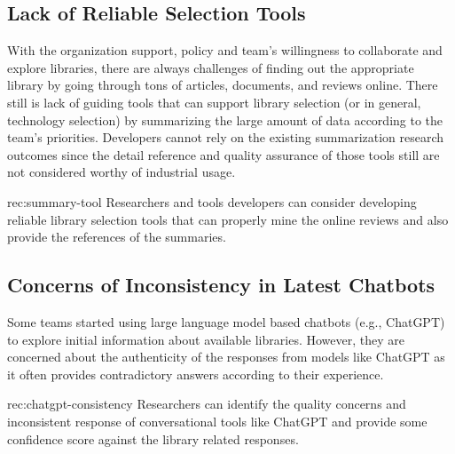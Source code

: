 \subsection{Lack of Reliable Selection Tools}
With the organization support, policy and team's willingness to collaborate and explore libraries, there are always challenges of finding out the appropriate library by going through tons of articles, documents, and reviews online. There still is lack of guiding tools that can support library selection (or in general, technology selection) by summarizing the large amount of data according to the team's priorities. Developers cannot rely on the existing summarization research outcomes since the detail reference and quality assurance of those tools still are not considered worthy of industrial usage.
  \begin{recommendation}{rec:summary-tool}
  Researchers and tools developers can consider developing reliable library selection tools that can properly mine the online reviews and also provide the references of the summaries.
\end{recommendation}

\subsection{Concerns of Inconsistency in Latest Chatbots}
Some teams started using large language model based chatbots (e.g., ChatGPT) to explore initial information about available libraries. However, they are concerned about the authenticity of the responses from models like ChatGPT as it often provides contradictory answers according to their experience.
  \begin{recommendation}{rec:chatgpt-consistency}
  Researchers can identify the quality concerns and inconsistent response of conversational tools like ChatGPT and provide some confidence score against the library related responses.
\end{recommendation}
